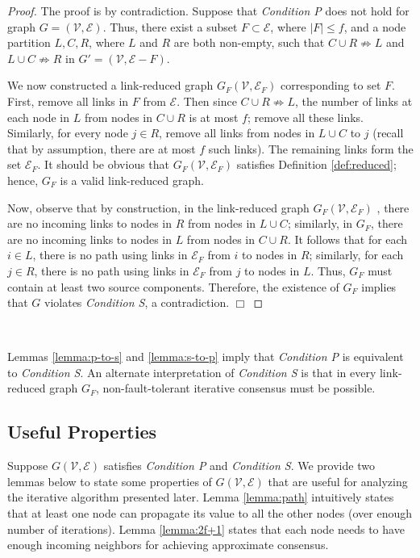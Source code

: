 \documentclass{llncs}
\newcommand{\fillbox}{\hspace*{\fill}\(\Box\)}
\newcommand{\scripte}{\mathcal{E}}
\newcommand{\scriptv}{\mathcal{V}}
\begin{document}
\begin{proof}
The proof is by contradiction. Suppose that {\em Condition P} does not hold for graph $G = (\scriptv,\scripte)$. Thus, there exist a subset $F \subset \scripte$, where $|F| \leq f$, and a node partition $L,C,R$, where $L$ and $R$ are both non-empty, such that $C\cup R\not\Rightarrow L$ and $L\cup C\not\Rightarrow R$ in $G' = (\scriptv, \scripte-F)$.

We now constructed a link-reduced graph $G_F(\scriptv, \scripte_F)$ corresponding to set $F$. First, remove all links in $F$ from $\scripte$. Then since $C\cup R\not\Rightarrow L$, the number of links at each node in $L$ from nodes in $C \cup R$ is at most $f$; remove all these links. Similarly, for every node $j \in R$, remove all links from nodes in $L \cup C$ to $j$ (recall that by assumption, there are at most $f$ such links). The remaining links form the set $\scripte_F$. It should be obvious that $G_F(\scriptv, \scripte_F)$ satisfies Definition \ref{def:reduced}; hence, $G_F$ is a valid link-reduced graph.

Now, observe that by construction, in the link-reduced graph $G_F(\scriptv, \scripte_F)$ , there are no incoming links to nodes in $R$ from nodes in $L\cup C$; similarly, in $G_F$, there are no incoming links to nodes in $L$ from nodes in $C\cup R$. It follows that for each $i \in L$, there is no path using links in $\scripte_F$ from $i$ to nodes in $R$; similarly, for each $j \in R$, there is no path using links in $\scripte_F$ from $j$ to nodes in $L$. Thus, $G_F$ must contain at least two source components. Therefore, the existence of $G_F$ implies that $G$ violates {\em Condition S}, a contradiction.
\fillbox
\end{proof}

~

Lemmas \ref{lemma:p-to-s} and \ref{lemma:s-to-p} imply that {\em Condition P} is equivalent to {\em Condition S}. An alternate interpretation of {\em Condition S} is that in every link-reduced graph $G_F$, non-fault-tolerant iterative consensus must be possible.



\subsection{Useful Properties}
\label{s:useful}

Suppose $G(\scriptv, \scripte)$ satisfies {\em Condition P} and {\em Condition S}. We provide two lemmas below to state some properties of $G(\scriptv, \scripte)$ that are useful for analyzing the iterative algorithm presented later. Lemma \ref{lemma:path} intuitively states that at least one node can propagate its value to all the other nodes (over enough number of iterations). Lemma \ref{lemma:2f+1} states that each node needs to have enough incoming neighbors for achieving approximate consensus. 
\end{document}
